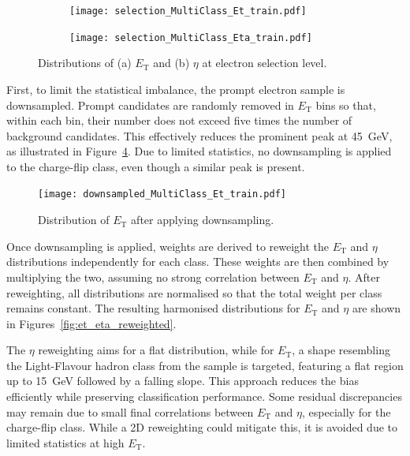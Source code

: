 \begin{figure}[htbp]
  \centering
  \begin{subfigure}[b]{0.48\textwidth}
      \centering
      \texttt{[image: selection\_MultiClass\_Et\_train.pdf]}
      \caption{}
      \label{fig:et_selection}
  \end{subfigure}
  \hfill
  \begin{subfigure}[b]{0.48\textwidth}
      \centering
      \texttt{[image: selection\_MultiClass\_Eta\_train.pdf]}
      \caption{}
      \label{fig:eta_selection}
  \end{subfigure}
  \caption{Distributions of (a) $E_{\text{T}}$ and (b) $\eta$ at electron selection level.}
  \label{fig:et_eta_selection}
\end{figure}

First, to limit the statistical imbalance, the prompt electron sample is downsampled. Prompt candidates are randomly removed in $E_{\text{T}}$ bins so that, within each bin, their number does not exceed five times the number of background candidates. This effectively reduces the prominent peak at 45~GeV, as illustrated in Figure~\ref{fig:et_downsampled}. Due to limited statistics, no downsampling is applied to the charge-flip class, even though a similar peak is present.

\begin{figure}[htbp]
  \centering
  \texttt{[image: downsampled\_MultiClass\_Et\_train.pdf]}
  \caption{Distribution of $E_{\text{T}}$ after applying downsampling.}
  \label{fig:et_downsampled}
\end{figure}

Once downsampling is applied, weights are derived to reweight the $E_{\text{T}}$ and $\eta$ distributions independently for each class. These weights are then combined by multiplying the two, assuming no strong correlation between $E_{\text{T}}$ and $\eta$. After reweighting, all distributions are normalised so that the total weight per class remains constant. The resulting harmonised distributions for $E_{\text{T}}$ and $\eta$ are shown in Figures~\ref{fig:et_eta_reweighted}.

The $\eta$ reweighting aims for a flat distribution, while for $E_{\text{T}}$, a shape resembling the Light-Flavour hadron class from the \ttbar sample is targeted, featuring a flat region up to 15~GeV followed by a falling slope. This approach reduces the bias efficiently while preserving classification performance. Some residual discrepancies may remain due to small final correlations between $E_{\text{T}}$ and $\eta$, especially for the charge-flip class. While a 2D reweighting could mitigate this, it is avoided due to limited statistics at high $E_{\text{T}}$.


